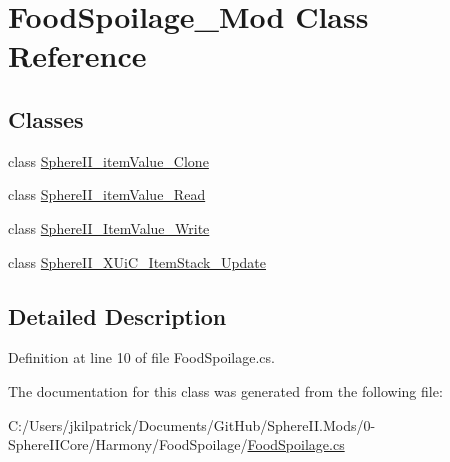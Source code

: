 \hypertarget{class_food_spoilage___mod}{}\section{Food\+Spoilage\+\_\+\+Mod Class Reference}
\label{class_food_spoilage___mod}
\subsection*{Classes}
\begin{DoxyCompactItemize}
\item 
class \mbox{\hyperlink{class_food_spoilage___mod_1_1_sphere_i_i__item_value___clone}{Sphere\+I\+I\+\_\+item\+Value\+\_\+\+Clone}}
\item 
class \mbox{\hyperlink{class_food_spoilage___mod_1_1_sphere_i_i__item_value___read}{Sphere\+I\+I\+\_\+item\+Value\+\_\+\+Read}}
\item 
class \mbox{\hyperlink{class_food_spoilage___mod_1_1_sphere_i_i___item_value___write}{Sphere\+I\+I\+\_\+\+Item\+Value\+\_\+\+Write}}
\item 
class \mbox{\hyperlink{class_food_spoilage___mod_1_1_sphere_i_i___x_ui_c___item_stack___update}{Sphere\+I\+I\+\_\+\+X\+Ui\+C\+\_\+\+Item\+Stack\+\_\+\+Update}}
\end{DoxyCompactItemize}


\subsection{Detailed Description}


Definition at line 10 of file Food\+Spoilage.\+cs.



The documentation for this class was generated from the following file\+:\begin{DoxyCompactItemize}
\item 
C\+:/\+Users/jkilpatrick/\+Documents/\+Git\+Hub/\+Sphere\+I\+I.\+Mods/0-\/\+Sphere\+I\+I\+Core/\+Harmony/\+Food\+Spoilage/\mbox{\hyperlink{_food_spoilage_8cs}{Food\+Spoilage.\+cs}}\end{DoxyCompactItemize}
